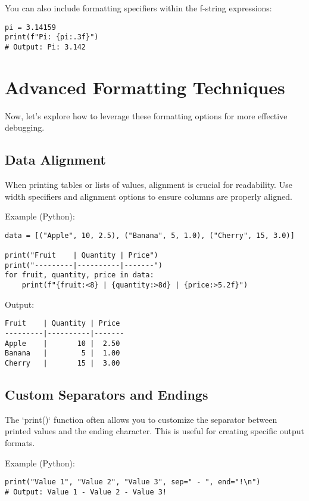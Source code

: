 \documentclass{article}
\begin{document}
You can also include formatting specifiers within the f-string expressions:

\begin{verbatim}
pi = 3.14159
print(f"Pi: {pi:.3f}")
# Output: Pi: 3.142
\end{verbatim}

\section*{Advanced Formatting Techniques}

Now, let's explore how to leverage these formatting options for more effective debugging.

\subsection*{Data Alignment}

When printing tables or lists of values, alignment is crucial for readability. Use width specifiers and alignment options to ensure columns are properly aligned.

Example (Python):

\begin{verbatim}
data = [("Apple", 10, 2.5), ("Banana", 5, 1.0), ("Cherry", 15, 3.0)]

print("Fruit    | Quantity | Price")
print("---------|----------|-------")
for fruit, quantity, price in data:
    print(f"{fruit:<8} | {quantity:>8d} | {price:>5.2f}")
\end{verbatim}

Output:

\begin{verbatim}
Fruit    | Quantity | Price
---------|----------|-------
Apple    |       10 |  2.50
Banana   |        5 |  1.00
Cherry   |       15 |  3.00
\end{verbatim}

\subsection*{Custom Separators and Endings}

The `print()` function often allows you to customize the separator between printed values and the ending character.  This is useful for creating specific output formats.

Example (Python):

\begin{verbatim}
print("Value 1", "Value 2", "Value 3", sep=" - ", end="!\n")
# Output: Value 1 - Value 2 - Value 3!
\end{verbatim}
\end{document}
